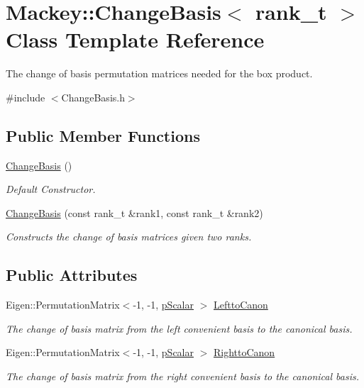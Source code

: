 \hypertarget{classMackey_1_1ChangeBasis}{}\section{Mackey\+:\+:Change\+Basis$<$ rank\+\_\+t $>$ Class Template Reference}
\label{classMackey_1_1ChangeBasis}


The change of basis permutation matrices needed for the box product.  




{\ttfamily \#include $<$Change\+Basis.\+h$>$}

\subsection*{Public Member Functions}
\begin{DoxyCompactItemize}
\item 
\hyperlink{classMackey_1_1ChangeBasis_a7edd090a5261e776f8e0221541822a87}{Change\+Basis} ()
\begin{DoxyCompactList}\small\item\em Default Constructor. \end{DoxyCompactList}\item 
\hyperlink{classMackey_1_1ChangeBasis_a036c1f54ffb4cf4115efa2fab60c354b}{Change\+Basis} (const rank\+\_\+t \&rank1, const rank\+\_\+t \&rank2)
\begin{DoxyCompactList}\small\item\em Constructs the change of basis matrices given two ranks. \end{DoxyCompactList}\end{DoxyCompactItemize}
\subsection*{Public Attributes}
\begin{DoxyCompactItemize}
\item 
Eigen\+::\+Permutation\+Matrix$<$-\/1, -\/1, \hyperlink{namespaceMackey_a67b5f4650ba2f166d15133a1bea2472b}{p\+Scalar} $>$ \hyperlink{classMackey_1_1ChangeBasis_aac6a5b932e7feea82c94447d541e6ded}{Leftto\+Canon}
\begin{DoxyCompactList}\small\item\em The change of basis matrix from the left convenient basis to the canonical basis. \end{DoxyCompactList}\item 
Eigen\+::\+Permutation\+Matrix$<$-\/1, -\/1, \hyperlink{namespaceMackey_a67b5f4650ba2f166d15133a1bea2472b}{p\+Scalar} $>$ \hyperlink{classMackey_1_1ChangeBasis_abde8b2dd297be6e5bff1f72c2a3cd208}{Rightto\+Canon}
\begin{DoxyCompactList}\small\item\em The change of basis matrix from the right convenient basis to the canonical basis. \end{DoxyCompactList}\end{DoxyCompactItemize}


